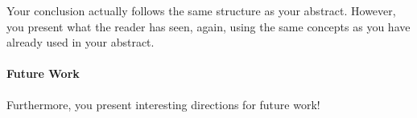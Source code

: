 Your conclusion actually follows the same structure as your abstract.
However, you present what the reader has seen, again, using the same concepts as you have already used in your abstract.

\paragraph{Future Work}
Furthermore, you present interesting directions for future work!